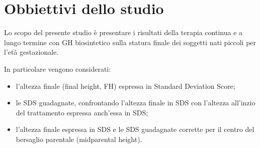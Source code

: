 


 
 





\section{Obbiettivi dello studio}

Lo scopo del presente studio è presentare i risultati della terapia continua e a lungo termine  con GH biosintetico sulla statura finale dei soggetti nati piccoli per l'età gestazionale.

In particolare vengono considerati:

\begin{itemize}
\item l'altezza finale (final height, FH) espressa in Standard Deviation Score;
\item le SDS guadagnate, confrontando l'altezza finale in SDS con l'altezza all'inzio del trattamento espressa anch'essa in SDS;
\item l'altezza finale espressa in SDS e le SDS guadagnate corrette per il centro del bersaglio parentale (midparental height).
\end{itemize}



